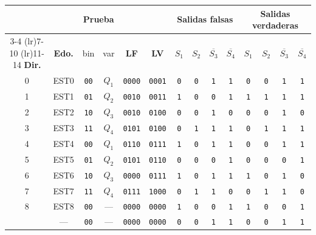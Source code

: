 \begin{tabular}{@{}c c c c c c cccc cccc@{}}
\toprule
 & & \multicolumn{2}{c}{\textbf{Prueba}} & & & \multicolumn{4}{c}{\textbf{Salidas falsas}} & \multicolumn{4}{c}{\textbf{Salidas verdaderas}} \\
\cmidrule(lr){3-4} \cmidrule(lr){7-10} \cmidrule(lr){11-14}
\textbf{Dir.} & \textbf{Edo.} & bin & var & \textbf{LF} & \textbf{LV} & $S_1$ & $S_2$ & $\overline{S_3}$ & $\overline{S_4}$ & $S_1$ & $S_2$ & $\overline{S_3}$ & $\overline{S_4}$ \\
\midrule
0 & EST0 & \texttt{00} & $Q_1$ & \texttt{0000} & \texttt{0001} & \texttt{0} & \texttt{0} & \texttt{1} & \texttt{1} & \texttt{0} & \texttt{0} & \texttt{1} & \texttt{1} \\
1 & EST1 & \texttt{01} & $Q_2$ & \texttt{0010} & \texttt{0011} & \texttt{1} & \texttt{0} & \texttt{0} & \texttt{1} & \texttt{1} & \texttt{1} & \texttt{1} & \texttt{1} \\
2 & EST2 & \texttt{10} & $Q_3$ & \texttt{0010} & \texttt{0100} & \texttt{0} & \texttt{0} & \texttt{1} & \texttt{0} & \texttt{0} & \texttt{0} & \texttt{1} & \texttt{0} \\
3 & EST3 & \texttt{11} & $Q_4$ & \texttt{0101} & \texttt{0100} & \texttt{0} & \texttt{1} & \texttt{1} & \texttt{1} & \texttt{0} & \texttt{1} & \texttt{1} & \texttt{1} \\
4 & EST4 & \texttt{00} & $Q_1$ & \texttt{0110} & \texttt{0111} & \texttt{1} & \texttt{0} & \texttt{1} & \texttt{1} & \texttt{0} & \texttt{0} & \texttt{1} & \texttt{1} \\
5 & EST5 & \texttt{01} & $Q_2$ & \texttt{0101} & \texttt{0110} & \texttt{0} & \texttt{0} & \texttt{0} & \texttt{1} & \texttt{0} & \texttt{0} & \texttt{0} & \texttt{1} \\
6 & EST6 & \texttt{10} & $Q_3$ & \texttt{0000} & \texttt{0111} & \texttt{1} & \texttt{0} & \texttt{1} & \texttt{1} & \texttt{1} & \texttt{0} & \texttt{1} & \texttt{0} \\
7 & EST7 & \texttt{11} & $Q_4$ & \texttt{0111} & \texttt{1000} & \texttt{0} & \texttt{1} & \texttt{1} & \texttt{0} & \texttt{0} & \texttt{1} & \texttt{1} & \texttt{0} \\
8 & EST8 & \texttt{00} & --- & \texttt{0000} & \texttt{0000} & \texttt{1} & \texttt{0} & \texttt{0} & \texttt{1} & \texttt{1} & \texttt{0} & \texttt{0} & \texttt{1} \\
\midrule
\addlinespace[2pt]
9 & --- & \texttt{00} & --- & \texttt{0000} & \texttt{0000} & \texttt{0} & \texttt{0} & \texttt{1} & \texttt{1} & \texttt{0} & \texttt{0} & \texttt{1} & \texttt{1} \\

\end{tabular}
